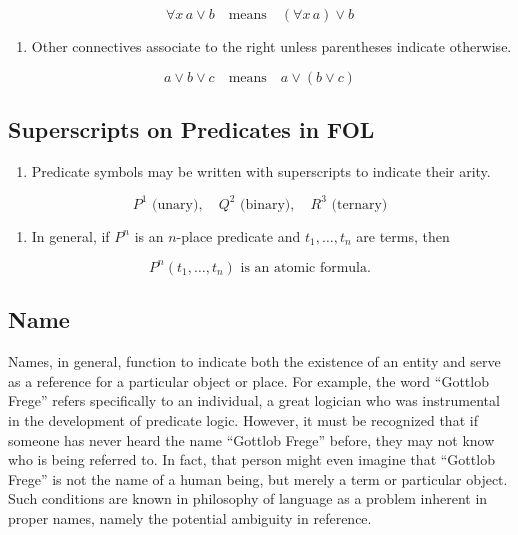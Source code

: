 \documentclass[12pt,a4paper,openany]{article}
\begin{document}
\[
  \forall x \, a \lor b \quad \text{means} \quad (\forall x \, a) \lor b
  \]

\begin{enumerate}
\def\labelenumi{\arabic{enumi}.}
\setcounter{enumi}{3}

\item
  Other connectives associate to the right unless parentheses indicate
  otherwise.
\end{enumerate}

\[
  a \lor b \lor c \quad \text{means} \quad a \lor (b \lor c)
  \]

\subsection{Superscripts on Predicates in
FOL}\label{superscripts-on-predicates-in-fol}

\begin{enumerate}
\def\labelenumi{\arabic{enumi}.}

\item
  Predicate symbols may be written with superscripts to indicate their
  arity.
\end{enumerate}

\[
  P^1 \text{ (unary)}, \quad Q^2 \text{ (binary)}, \quad R^3 \text{ (ternary)}
  \]

\begin{enumerate}
\def\labelenumi{\arabic{enumi}.}
\setcounter{enumi}{1}

\item
  In general, if \(P^n\) is an \(n\)-place predicate and
  \(t_1, \dots, t_n\) are terms, then
\end{enumerate}

\[P^n(t_1, \dots, t_n) \text{ is an atomic formula.}\]

\subsection{Name}\label{name}

Names, in general, function to indicate both the existence of an entity
and serve as a reference for a particular object or place. For example,
the word ``Gottlob Frege'' refers specifically to an individual, a great
logician who was instrumental in the development of predicate logic.
However, it must be recognized that if someone has never heard the name
``Gottlob Frege'' before, they may not know who is being referred to. In
fact, that person might even imagine that ``Gottlob Frege'' is not the
name of a human being, but merely a term or particular object. Such
conditions are known in philosophy of language as a problem inherent in
proper names, namely the potential ambiguity in reference.
\end{document}
